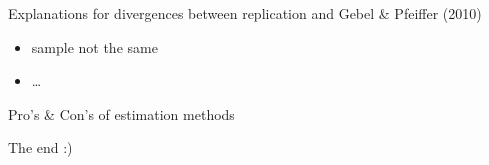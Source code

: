 \documentclass[10pt,ignorenonframetext,]{beamer}
\providecommand{\tightlist}{%
  \setlength{\itemsep}{0pt}\setlength{\parskip}{0pt}}
\begin{document}
\begin{frame}{Explanations for divergences between replication and Gebel
\& Pfeiffer (2010)}
\protect\hypertarget{explanations-for-divergences-between-replication-and-gebel-pfeiffer-2010}{}

\begin{itemize}
\tightlist
\item
  sample not the same
\item
  \ldots{}
\end{itemize}

\end{frame}

\begin{frame}{Pro's \& Con's of estimation methods}
\protect\hypertarget{pros-cons-of-estimation-methods}{}

\end{frame}

\begin{frame}{The end :)}
\protect\hypertarget{the-end}{}

\end{frame}
\end{document}
